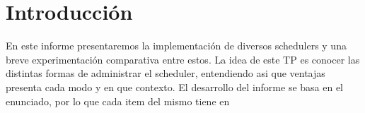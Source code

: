 \section{Introducci\'on}

En este informe presentaremos la implementaci\'on de diversos schedulers y una breve experimentaci\'on comparativa entre estos. 
La idea de este TP es conocer las distintas formas de administrar el scheduler, entendiendo asi que ventajas presenta cada modo y en que contexto.
El desarrollo del informe se basa en el enunciado, por lo que cada item del mismo tiene en 

